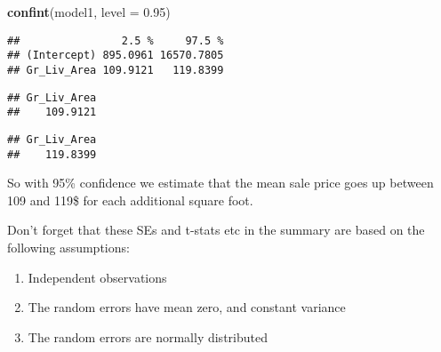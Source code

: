 \documentclass[]{article}
\newenvironment{Shaded}{\begin{snugshade}}{\end{snugshade}}
\newcommand{\CommentTok}[1]{\textcolor[rgb]{0.56,0.35,0.01}{\textit{#1}}}
\newcommand{\DataTypeTok}[1]{\textcolor[rgb]{0.13,0.29,0.53}{#1}}
\newcommand{\DecValTok}[1]{\textcolor[rgb]{0.00,0.00,0.81}{#1}}
\newcommand{\FloatTok}[1]{\textcolor[rgb]{0.00,0.00,0.81}{#1}}
\newcommand{\KeywordTok}[1]{\textcolor[rgb]{0.13,0.29,0.53}{\textbf{#1}}}
\newcommand{\NormalTok}[1]{#1}
\newcommand{\OperatorTok}[1]{\textcolor[rgb]{0.81,0.36,0.00}{\textbf{#1}}}
\newcommand{\StringTok}[1]{\textcolor[rgb]{0.31,0.60,0.02}{#1}}
\providecommand{\tightlist}{%
  \setlength{\itemsep}{0pt}\setlength{\parskip}{0pt}}
\begin{document}
\begin{Shaded}
\begin{Highlighting}[]
\KeywordTok{confint}\NormalTok{(model1, }\DataTypeTok{level =} \FloatTok{0.95}\NormalTok{)}
\end{Highlighting}
\end{Shaded}

\begin{verbatim}
##                2.5 %     97.5 %
## (Intercept) 895.0961 16570.7805
## Gr_Liv_Area 109.9121   119.8399
\end{verbatim}

\begin{Shaded}
\end{Shaded}

\begin{verbatim}
## Gr_Liv_Area 
##    109.9121
\end{verbatim}

\begin{Shaded}
\end{Shaded}

\begin{verbatim}
## Gr_Liv_Area 
##    119.8399
\end{verbatim}

So with 95\% confidence we estimate that the mean sale price goes up
between 109 and 119\$ for each additional square foot.

Don't forget that these SEs and t-stats etc in the summary are based on
the following assumptions:

\begin{enumerate}
\def\labelenumi{\arabic{enumi}.}
\tightlist
\item
  Independent observations
\item
  The random errors have mean zero, and constant variance
\item
  The random errors are normally distributed
\end{enumerate}
\end{document}

